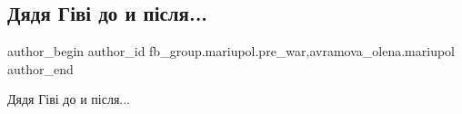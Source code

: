  
 
 
 
 

\subsection{Дядя Гіві до и після...}
\label{sec:04_02_2023.fb.fb_group.mariupol.pre_war.1.dyadya_g_v__do_i_p_s}
 
\ifcmt
 author_begin
   author_id fb_group.mariupol.pre_war,avramova_olena.mariupol
 author_end
\fi

Дядя Гіві до и після...

